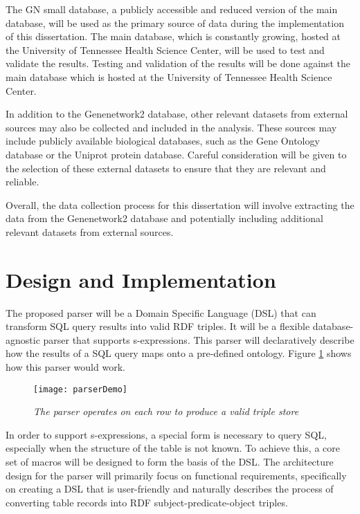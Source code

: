 The GN small database, a publicly accessible and reduced version of the main database, will be used as the primary source of data during the implementation of this dissertation.  The main database, which is constantly growing, hosted at the University of Tennessee Health Science Center, will be used to test and validate the results.  Testing and validation of the results will be done against the main database which is hosted at the University of Tennessee Health Science Center.

In addition to the Genenetwork2 database, other relevant datasets from external sources may also be collected and included in the analysis.  These sources may include publicly available biological databases, such as the Gene Ontology database or the Uniprot protein database.  Careful consideration will be given to the selection of these external datasets to ensure that they are relevant and reliable.

Overall, the data collection process for this dissertation will involve extracting the data from the Genenetwork2 database and potentially including additional relevant datasets from external sources.

\section{Design and Implementation}

The proposed parser will be a Domain Specific Language (DSL) that can transform SQL query results into valid RDF triples.  It will be a flexible database-agnostic parser that supports s-expressions.  This parser will declaratively describe how the results of a SQL query maps onto a pre-defined ontology.  Figure \ref{fig:parser-demo} shows how this parser would work.

\begin{figure}[H]
  \centering
  \texttt{[image: parserDemo]}
  \caption{\textit{The parser operates on each row to produce a valid triple store}}
  \label{fig:parser-demo}
  \centering
\end{figure}

In order to support s-expressions, a special form is necessary to query SQL, especially when the structure of the table is not known.  To achieve this, a core set of macros will be designed to form the basis of the DSL.  The architecture design for the parser will primarily focus on functional requirements, specifically on creating a DSL that is user-friendly and naturally describes the process of converting table records into RDF subject-predicate-object triples.

